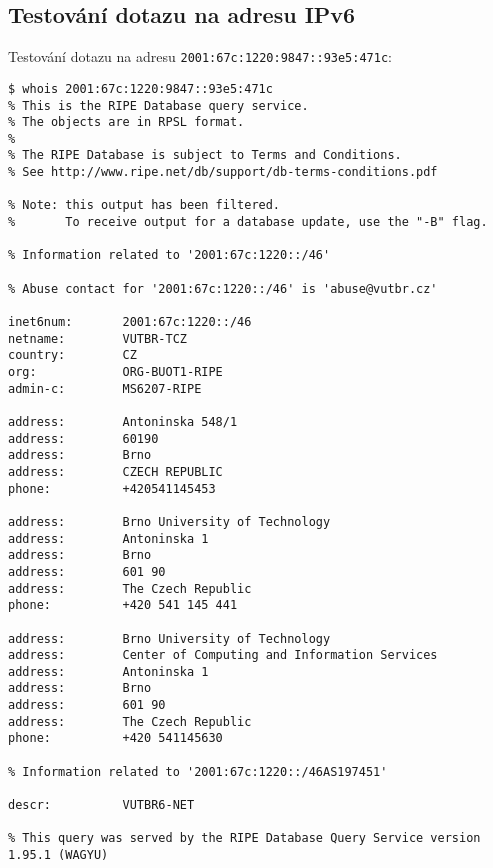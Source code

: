 \documentclass[a4paper, 11pt]{article}
\begin{document}
\subsection{Testování dotazu na adresu IPv6}
Testování dotazu na adresu \verb|2001:67c:1220:9847::93e5:471c|:
\begin{lstlisting}
$ whois 2001:67c:1220:9847::93e5:471c
% This is the RIPE Database query service.
% The objects are in RPSL format.
%
% The RIPE Database is subject to Terms and Conditions.
% See http://www.ripe.net/db/support/db-terms-conditions.pdf

% Note: this output has been filtered.
%       To receive output for a database update, use the "-B" flag.

% Information related to '2001:67c:1220::/46'

% Abuse contact for '2001:67c:1220::/46' is 'abuse@vutbr.cz'

inet6num:       2001:67c:1220::/46
netname:        VUTBR-TCZ
country:        CZ
org:            ORG-BUOT1-RIPE
admin-c:        MS6207-RIPE

address:        Antoninska 548/1
address:        60190
address:        Brno
address:        CZECH REPUBLIC
phone:          +420541145453

address:        Brno University of Technology
address:        Antoninska 1
address:        Brno
address:        601 90
address:        The Czech Republic
phone:          +420 541 145 441

address:        Brno University of Technology
address:        Center of Computing and Information Services
address:        Antoninska 1
address:        Brno
address:        601 90
address:        The Czech Republic
phone:          +420 541145630

% Information related to '2001:67c:1220::/46AS197451'

descr:          VUTBR6-NET

% This query was served by the RIPE Database Query Service version 1.95.1 (WAGYU)


\end{lstlisting}
\end{document}
